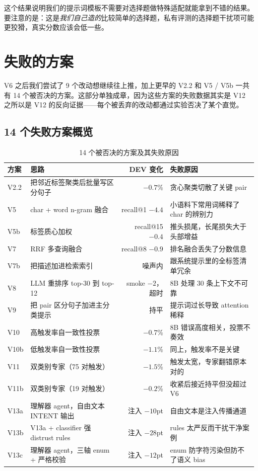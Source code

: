 \documentclass[11pt,a4paper]{article}
\begin{document}
这个结果说明我们的提示词模板不需要对选择题做特殊适配就能拿到不错的结果。要注意的是：这是\emph{我们自己造的}比较简单的选择题，私有评测的选择题干扰项可能更狡猾，真实分数应该会低一些。

\section{失败的方案}
\label{sec:failures}

V6 之后我们尝试了 9 个改动想继续往上推，加上更早的 V2.2 和 V5 / V5b 一共有 14 个被否决的方案。这部分单独成章，因为这些方案的失败数据其实是 V12 之所以是 V12 的反向证据——每个被丢弃的改动都通过实验否决了某个直觉。

\subsection{14 个失败方案概览}

\begin{table}[h]
\centering
\caption{14 个被否决的方案及其失败原因}
\label{tab:failures}
\small
\begin{tabular}{llrl}
\toprule
方案 & 思路 & DEV 变化 & 失败原因 \\
\midrule
V2.2 & 把邻近标签聚类后批量写区分句子 & $-0.7$\% & 贪心聚类切散了关键 pair \\
V5   & char + word n-gram 融合 & recall@1 $-4.4$ & 小语料下常用词稀释了 char 的辨别力 \\
V5b  & 标签质心加权 & recall@15 $-0.4$ & 推头损尾，长尾损失大于头部增益 \\
V7   & RRF 多查询融合 & recall@8 $-0.9$ & 排名融合丢失了分数信息 \\
V7b  & 把描述加进检索索引 & 噪声内 & 跟系统提示里的全标签清单冗余 \\
V8   & LLM 重排序 top-30 到 top-12 & smoke $-2$，超时 & 8B 处理 30 条上下文不可靠 \\
V9   & 把 pair 区分句子加进主分类提示 & 持平 & 提示词过长导致 attention 稀释 \\
V10  & 高触发率自一致性投票 & $-0.7$\% & 8B 错误高度相关，投票不奏效 \\
V10b & 低触发率自一致性投票 & $-1.1$\% & 同上，触发率不是关键 \\
V11  & 双类别专家（75 对触发）& $-1.5$\% & 触发太宽，专家翻错原本对的 \\
V11b & 双类别专家（19 对触发）& $-0.2$\% & 收紧后接近持平但没超过 V6 \\
V13a & 理解器 agent，自由文本 INTENT 输出 & 注入 $-10$pt & 自由文本是注入传播通道 \\
V13b & V13a + classifier 强 distrust rules & 注入 $-28$pt & rules 太严反而干扰干净案例 \\
V13c & 理解器 agent，三轴 enum + 严格校验 & 注入 $-12$pt & enum 防字符污染但防不了语义 bias \\
\bottomrule
\end{tabular}
\end{table}
\end{document}
